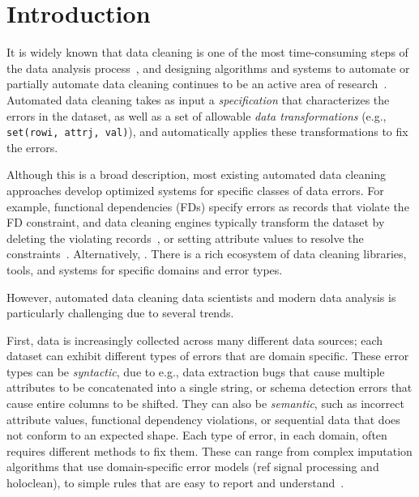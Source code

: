 \section{Introduction}\label{intro}\sloppy

It is widely known that data cleaning is one of the most time-consuming steps of the data analysis process~\cite{nytimes}, and designing algorithms and systems to automate or partially automate data cleaning continues to be an active area of research~\cite{DBLP:conf/sigmod/ChuIKW16}.  Automated data cleaning takes as input a {\it specification} that characterizes the errors in the dataset, as well as a set of allowable {\it data transformations} (e.g., \texttt{set(rowi, attrj, val)}), and automatically applies these transformations to fix the errors.  

Although this is a broad description, most existing automated data cleaning approaches develop optimized systems for specific classes of data errors.  For example, functional dependencies (FDs) specify errors as records that violate the FD constraint, and data cleaning engines typically transform the dataset by deleting the violating records~\cite{}, or setting attribute values to resolve the constraints~\cite{}.  Alternatively, .  There is a rich ecosystem of data cleaning libraries, tools, and systems for specific domains and error types.

However, automated data cleaning data scientists and modern data analysis is particularly challenging due to several trends.  



First, data is increasingly collected across many different data sources; each dataset can exhibit different types of errors that are domain specific.  These error types can be {\it syntactic}, due to e.g., data extraction bugs that cause multiple attributes to be concatenated into a single string, or schema detection errors that cause entire columns to be shifted.  They can also be {\it semantic}, such as incorrect attribute values, functional dependency violations, or sequential data that does not conform to an expected shape.   Each type of error, in each domain, often requires different methods to fix them.  These can range from complex imputation algorithms that use domain-specific error models (ref signal processing and holoclean), to simple rules that are easy to report and understand~\cite{}.  

